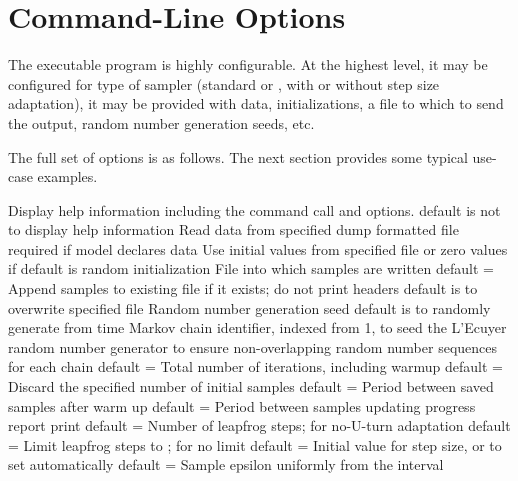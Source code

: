 \section{Command-Line Options}\label{stan-command-line-options.section}

The executable \Stan program is highly configurable.  At the highest
level, it may be configured for type of sampler (standard \HMC or
\NUTS, with or without step size adaptation), it may
be provided with data, initializations, a file to which to send the
output, random number generation seeds, etc.

The full set of options is as follows.  The next section provides
some typical use-case examples.
%
\begin{description}
{Display help information including the command call and
  options.}
{default is not to display help information}
%
{Read data from specified dump formatted
  file}
{required if model declares data}
%
{Use initial values from specified file or zero
  values if }
{default is random initialization}
%
{File into which samples are written}
{default = }
%
{Append samples to existing file if it exists; do not print headers}
{default is to overwrite specified file}
%
{Random number generation seed}
{default is to randomly generate from time}
%
{Markov chain identifier, indexed from 1, to seed the L'Ecuyer 
  random number generator to ensure non-overlapping random number
  sequences for each chain \citep{Lecuyer:1999}}
{default = }
%
{Total number of iterations, including warmup}
{default = }
%
{Discard the specified number of initial samples}
{default = }
%
{Period between saved samples after warm up}
{default = }
%
{Period between samples updating progress report print}
{default = }
%
{Number of leapfrog steps;  for no-U-turn adaptation}
{default = }
%
{Limit \NUTS leapfrog steps to ;  for no limit}
{default = }
%
{Initial value for step size, or  to set automatically}
{default = }
%
{Sample epsilon uniformly from the interval 
\\
}
\end{description}
